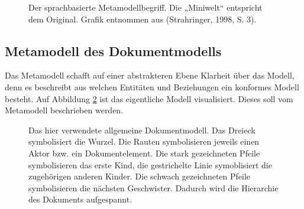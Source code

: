  
\begin{figure}[h!]
\centering
{}
\caption[Der sprachbasierte Metamodellbegriff]{ Der sprachbasierte Metamodellbegriff. Die „Miniwelt“ entspricht dem Original. Grafik entnommen aus (Strahringer, 1998, S. 3). }\label{metamodellbegriff}
\end{figure}
 
\subsection{Metamodell des Dokumentmodells}\label{metamodell_dokument}
 
Das Metamodell schafft auf einer abstrakteren Ebene Klarheit über das Modell, denn es beschreibt aus welchen Entitäten und Beziehungen ein konformes Modell besteht. Auf Abbildung \ref{docmodell} ist das eigentliche Modell visualisiert. Dieses soll vom Metamodell beschrieben werden.

 
\begin{figure}[h!]
\centering
{}
\caption[Allgemeines Dokumentmodell]{ Das hier verwendete allgemeine Dokumentmodell. Das Dreieck symbolisiert die Wurzel. Die Rauten symbolisieren jeweils einen Aktor bzw. ein Dokumentelement. Die stark gezeichneten Pfeile symbolisieren das erste Kind, die gestrichelte Linie symoblisiert die zugehörigen anderen Kinder. Die schwach gezeichneten Pfeile symbolisieren die nächsten Geschwister. Dadurch wird die Hierarchie des Dokuments aufgespannt. }\label{docmodell}
\end{figure}
 
